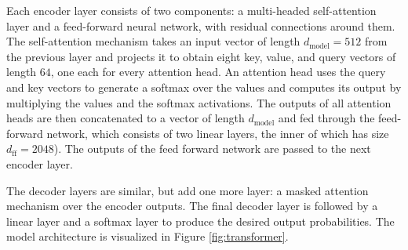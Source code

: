 \documentclass[11pt,a4paper]{article}
\begin{document}
Each encoder layer consists of two components: a multi-headed self-attention layer and a feed-forward neural network, with residual connections around them. The self-attention mechanism takes an input vector of length $d_{\text{model}} = 512$ from the previous layer and projects it to obtain eight key, value, and query vectors of length $64$, one each for every attention head. An attention head uses the query and key vectors to generate a softmax over the values and computes its output by multiplying the values and the softmax activations. The outputs of all attention heads are then concatenated to a vector of length $d_{\text{model}}$ and fed through the feed-forward network, which consists of two linear layers, the inner of which has size $d_{\text{ff}} = 2048$). The outputs of the feed forward network are passed to the next encoder layer.


The decoder layers are similar, but add one more layer: a masked attention mechanism over the encoder outputs. The final decoder layer is followed by a linear layer and a softmax layer to produce the desired output probabilities. The model architecture is visualized in Figure \ref{fig:transformer}.


\end{document}
